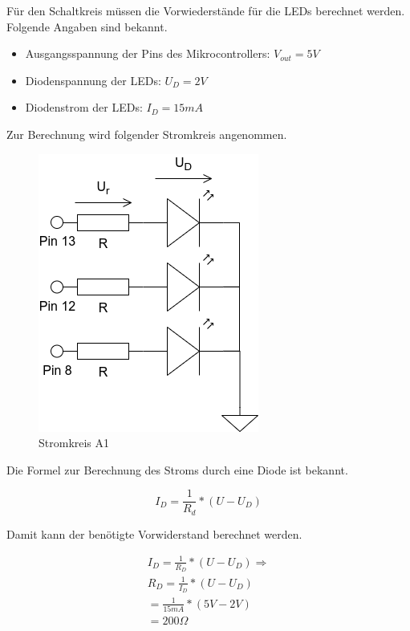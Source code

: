 Für den Schaltkreis müssen die Vorwiederstände für die LEDs berechnet werden.
Folgende Angaben sind bekannt.

\begin{itemize}
    \item Ausgangsspannung der Pins des Mikrocontrollers: $V_{out} = 5V$
    \item Diodenspannung der LEDs: $U_D = 2V$
    \item Diodenstrom der LEDs: $I_D = 15mA$
\end{itemize}

Zur Berechnung wird folgender Stromkreis angenommen.

\begin{figure}[h]
    \centering
    \includegraphics[height=0.4\textheight]{pictures/A1.png}
    \caption{Stromkreis A1}
    \label{fig:stromkreis-a1}
\end{figure}

Die Formel zur Berechnung des Stroms durch eine Diode ist bekannt.

\begin{equation}
    I_D =  \frac{1}{R_d} * (U - U_D) \label{eq:diodenstrom}
\end{equation}

Damit kann der benötigte Vorwiderstand berechnet werden.

\begin{equation}
    \begin{align}
        I_D =  \frac{1}{R_D} * (U - U_D) \Rightarrow \\
        R_D = \frac{1}{I_D} * (U - U_D) \\
        = \frac{1}{15mA} * (5V - 2V) \\
        = 200\Omega
    \end{align}
    \label{eq:equation-a1}
\end{equation}

